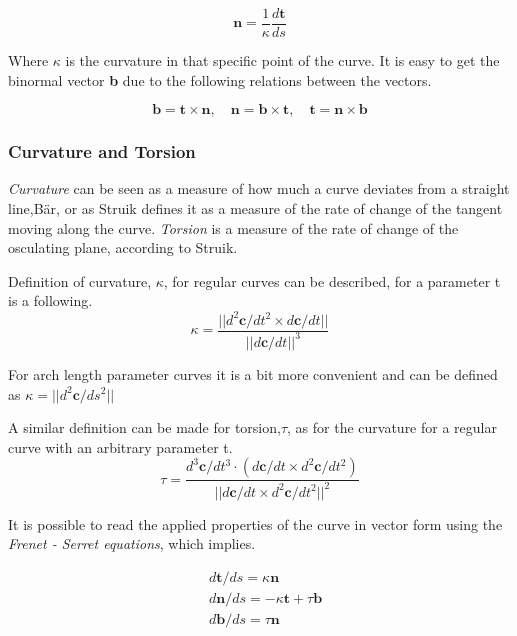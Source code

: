 \begin{equation}
\textbf{n} = \frac{1}{\kappa}\frac{d\textbf{t}}{ds} 
\end{equation}

Where $\kappa$ is the curvature in that specific point of the curve. It is easy to get the binormal vector \textbf{b} due to the following relations between the vectors.

\begin{equation}
\textbf{b} = \textbf{t} \times \textbf{n} ,\quad \textbf{n} = \textbf{b} \times \textbf{t} ,\quad \textbf{t} = \textbf{n} \times \textbf{b} 
\end{equation}

\subsubsection{Curvature and Torsion} \label{curvature}

\textit{Curvature} can be seen as a measure of how much a curve deviates from a straight line,Bär, or as Struik defines it as a measure of the rate of change of the tangent moving along the curve. \textit{Torsion} is a measure of the rate of change of the osculating plane, according to Struik.

\vspace{5mm} %

Definition of curvature, $\kappa$, for regular curves can be described, for a parameter t is a following. 
\begin{equation}
\kappa = \frac{|| d^2\textbf{c}/ dt^2 \times d\textbf{c}/dt ||}{||d\textbf{c}/dt||^3} 
\end{equation}

For arch length parameter curves it is a bit more convenient and can be defined as $\kappa = ||d^2 \textbf{c}/ ds^2||$

A similar definition can be made for torsion,$\tau$, as for the curvature for a regular curve with an arbitrary parameter t. 
\begin{equation}
\tau = \frac{ d^3\textbf{c}/ dt^3 \cdot(d\textbf{c}/dt \times d^2\textbf{c}/dt^2)}{||d\textbf{c}/dt \times d^2\textbf{c}/dt^2||^2} 
\end{equation}

It is possible to read the applied properties of the curve in vector form using the \textit{Frenet - Serret equations}, which implies.


\begin{align}
&d\textbf{t}/ds = \kappa \textbf{n} \\
&d\textbf{n}/ds = - \kappa \textbf{t} + \tau \textbf{b}\\
&d\textbf{b}/ds = \tau \textbf{n}
\end{align}



